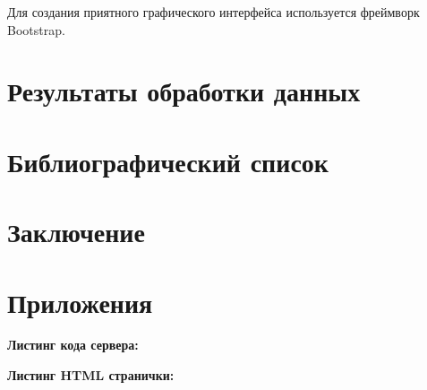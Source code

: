 \documentclass[a4paper,14pt]{article}
\begin{document}
	Для создания приятного графического интерфейса используется фреймворк Bootstrap.

\section{Результаты обработки данных}

\section{Библиографический список}

\section{Заключение}

\section{Приложения}

\textbf{Листинг кода сервера:}

{\small }

\textbf{Листинг HTML странички:}

{\small }
\end{document}
